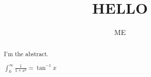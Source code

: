 \documentclass{xourse}
\title{HELLO}
\author{ME}
\begin{document}
\begin{abstract}

I'm the abstract.

$\int_0^{\infty}\frac{1}{1+x^2}=\tan^{-1}x$

\end{abstract}
\maketitle

\end{document}
